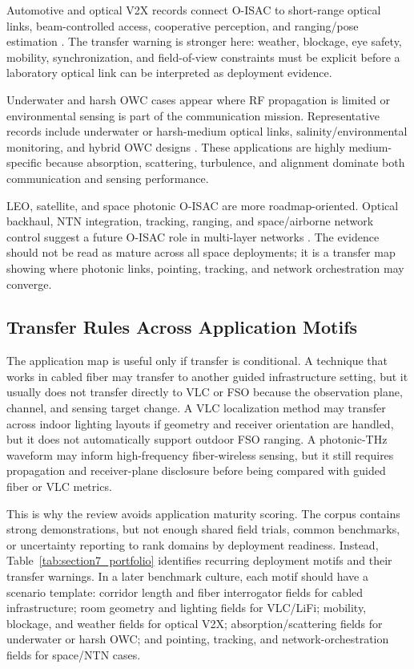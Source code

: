 \documentclass[letterpaper,journal]{IEEEtran}
\begin{document}
Automotive and optical V2X records connect O-ISAC to short-range optical links, beam-controlled access, cooperative perception, and ranging/pose estimation \cite{O_ISAC_003,O_ISAC_021,O_ISAC_034,O_ISAC_071,O_ISAC_089,O_ISAC_109,O_ISAC_137}. The transfer warning is stronger here: weather, blockage, eye safety, mobility, synchronization, and field-of-view constraints must be explicit before a laboratory optical link can be interpreted as deployment evidence.

Underwater and harsh OWC cases appear where RF propagation is limited or environmental sensing is part of the communication mission. Representative records include underwater or harsh-medium optical links, salinity/environmental monitoring, and hybrid OWC designs \cite{O_ISAC_005,O_ISAC_027,O_ISAC_055,O_ISAC_108,O_ISAC_187,O_ISAC_252}. These applications are highly medium-specific because absorption, scattering, turbulence, and alignment dominate both communication and sensing performance.

LEO, satellite, and space photonic O-ISAC are more roadmap-oriented. Optical backhaul, NTN integration, tracking, ranging, and space/airborne network control suggest a future O-ISAC role in multi-layer networks \cite{O_ISAC_059,O_ISAC_070,O_ISAC_127,O_ISAC_130,O_ISAC_164,O_ISAC_220,O_ISAC_248,O_ISAC_276,O_ISAC_291}. The evidence should not be read as mature across all space deployments; it is a transfer map showing where photonic links, pointing, tracking, and network orchestration may converge.

\subsection{Transfer Rules Across Application Motifs}

The application map is useful only if transfer is conditional. A technique that works in cabled fiber may transfer to another guided infrastructure setting, but it usually does not transfer directly to VLC or FSO because the observation plane, channel, and sensing target change. A VLC localization method may transfer across indoor lighting layouts if geometry and receiver orientation are handled, but it does not automatically support outdoor FSO ranging. A photonic-THz waveform may inform high-frequency fiber-wireless sensing, but it still requires propagation and receiver-plane disclosure before being compared with guided fiber or VLC metrics.

This is why the review avoids application maturity scoring. The corpus contains strong demonstrations, but not enough shared field trials, common benchmarks, or uncertainty reporting to rank domains by deployment readiness. Instead, Table~\ref{tab:section7_portfolio} identifies recurring deployment motifs and their transfer warnings. In a later benchmark culture, each motif should have a scenario template: corridor length and fiber interrogator fields for cabled infrastructure; room geometry and lighting fields for VLC/LiFi; mobility, blockage, and weather fields for optical V2X; absorption/scattering fields for underwater or harsh OWC; and pointing, tracking, and network-orchestration fields for space/NTN cases.
\end{document}
